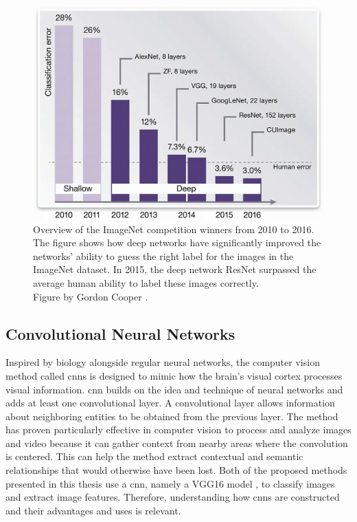     \begin{figure}[htb]
        \centering
        \includegraphics[width=\linewidth]{images/imagenet_results_graph.jpeg}
        \caption[Overview of the ImageNet competition winners from 2010 to 2016.]{Overview of the ImageNet competition winners from 2010 to 2016. The figure shows how deep networks have significantly improved the networks' ability to guess the right label for the images in the ImageNet dataset. In 2015, the deep network ResNet \cite{heDeepResidualLearning2015} surpassed the average human ability to label these images correctly. \\
        Figure by Gordon Cooper \cite{cooperSoftwareFrameworkRequirements2017}.}
        \label{fig:imagenet_results_graph}
    \end{figure}


    
    \subsection{Convolutional Neural Networks}

    Inspired by biology alongside regular neural networks, the computer vision method called \glspl{cnn} is designed to mimic how the brain's visual cortex processes visual information. \gls{cnn} builds on the idea and technique of neural networks and adds at least one convolutional layer. A convolutional layer allows information about neighboring entities to be obtained from the previous layer. The method has proven particularly effective in computer vision to process and analyze images and video because it can gather context from nearby areas where the convolution is centered. This can help the method extract contextual and semantic relationships that would otherwise have been lost. Both of the proposed methods presented in this thesis use a \gls{cnn}, namely a VGG16 model \cite{simonyanVeryDeepConvolutional2015}, to classify images and extract image features. Therefore, understanding how \glspl{cnn} are constructed and their advantages and uses is relevant.

